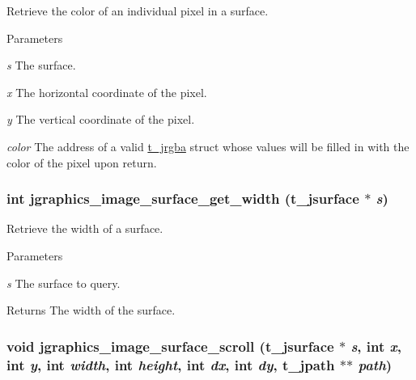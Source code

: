 Retrieve the color of an individual pixel in a surface. 
\begin{DoxyParams}{Parameters}
\item[{\em s}]The surface. \item[{\em x}]The horizontal coordinate of the pixel. \item[{\em y}]The vertical coordinate of the pixel. \item[{\em color}]The address of a valid \hyperlink{structt__jrgba}{t\_\-jrgba} struct whose values will be filled in with the color of the pixel upon return. \end{DoxyParams}
\hypertarget{group__jsurface_ga28bdb47bb4dd73c793574e941eb23d13}{
\subsubsection[{jgraphics\_\-image\_\-surface\_\-get\_\-width}]{\setlength{\rightskip}{0pt plus 5cm}int jgraphics\_\-image\_\-surface\_\-get\_\-width ({\bf t\_\-jsurface} $\ast$ {\em s})}}
\label{group__jsurface_ga28bdb47bb4dd73c793574e941eb23d13}


Retrieve the width of a surface. 
\begin{DoxyParams}{Parameters}
\item[{\em s}]The surface to query. \end{DoxyParams}
\begin{DoxyReturn}{Returns}
The width of the surface. 
\end{DoxyReturn}
\hypertarget{group__jsurface_ga488683dd70cacdedfc6018dd3c78adc7}{
\subsubsection[{jgraphics\_\-image\_\-surface\_\-scroll}]{\setlength{\rightskip}{0pt plus 5cm}void jgraphics\_\-image\_\-surface\_\-scroll ({\bf t\_\-jsurface} $\ast$ {\em s}, \/  int {\em x}, \/  int {\em y}, \/  int {\em width}, \/  int {\em height}, \/  int {\em dx}, \/  int {\em dy}, \/  {\bf t\_\-jpath} $\ast$$\ast$ {\em path})}}
\label{group__jsurface_ga488683dd70cacdedfc6018dd3c78adc7}

